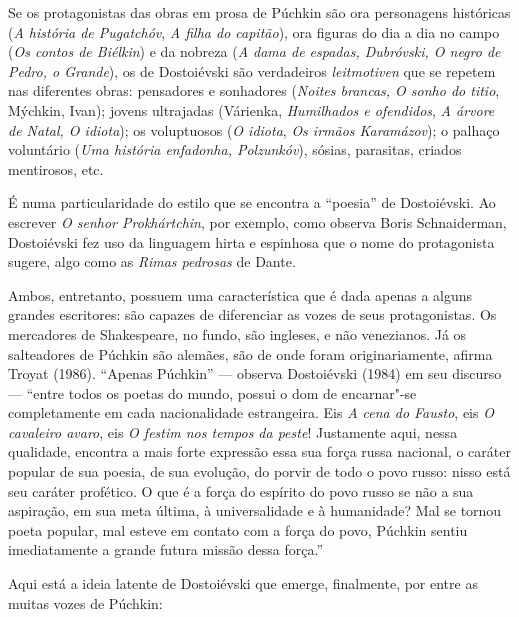Se os protagonistas das obras em prosa de Púchkin são ora personagens
históricas (\emph{A história de Pugatchóv}, \emph{A filha do capitão}),
ora figuras do dia a dia no campo (\emph{Os contos de Biélkin}) e da
nobreza (\emph{A dama de espadas, Dubróvski, O negro de Pedro, o
Grande}), os de Dostoiévski são verdadeiros \emph{leitmotiven}
que se repetem nas diferentes obras: pensadores e sonhadores
(\emph{Noites brancas, O sonho do titio}, Mýchkin, Ivan); jovens ultrajadas (Várienka, \emph{Humilhados e ofendidos}, \emph{A árvore de Natal, O idiota}); os voluptuosos (\emph{O idiota}, \emph{Os irmãos Karamázov}); o palhaço
voluntário (\emph{Uma história enfadonha, Polzunkóv}), sósias,
parasitas, criados mentirosos, etc.

É numa particularidade do estilo que se encontra a ``poesia'' de Dostoiévski. Ao escrever \emph{O senhor Prokhártchin}, por exemplo, como observa Boris Schnaiderman, Dostoiévski fez uso da linguagem hirta e espinhosa que o nome do protagonista sugere, algo como as \emph{Rimas pedrosas} de Dante.

Ambos, entretanto, possuem uma característica que é dada apenas
a alguns grandes escritores: são capazes de diferenciar as vozes
de seus protagonistas. Os mercadores de Shakespeare, no fundo,
são ingleses, e não venezianos. Já os salteadores de Púchkin são
alemães, são de onde foram originariamente, afirma Troyat (1986).
``Apenas Púchkin'' --- observa Dostoiévski (1984) em seu discurso ---
``entre todos os poetas do mundo, possui o dom de encarnar"-se
completamente em cada nacionalidade estrangeira. Eis \emph{A
cena do Fausto}, eis \emph{O cavaleiro avaro}, eis \emph{O festim
nos tempos da peste}! Justamente aqui, nessa qualidade, encontra
a mais forte expressão essa sua força russa nacional, o caráter
popular de sua poesia, de sua evolução, do porvir de todo o povo
russo: nisso está seu caráter profético. O que é a força do espírito do povo russo se não a sua aspiração, em sua meta última, à universalidade e à humanidade? Mal se tornou poeta popular, mal esteve em contato com a força do povo, Púchkin sentiu imediatamente a grande futura missão dessa força.''

Aqui está a ideia latente de Dostoiévski que emerge, finalmente, por
entre as muitas vozes de Púchkin:

